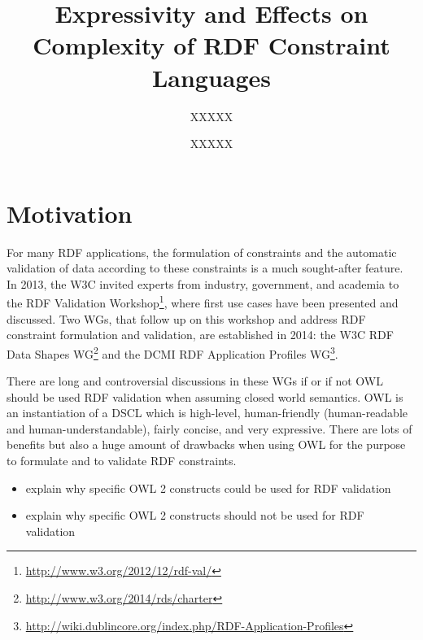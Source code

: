 \documentclass{llncs}
\begin{document}
%
%
\title{Expressivity and Effects on Complexity of RDF Constraint Languages}
%
%
\author{XXXXX \and XXXXX}
%
%

\maketitle              %

\begin{abstract}


\end{abstract}
%

\section{Motivation}

For many RDF applications, the formulation of constraints and the automatic validation of data according to these constraints is a much sought-after feature. 
In 2013, the W3C invited experts from industry, government, and academia to the RDF Validation Workshop\footnote{\url{http://www.w3.org/2012/12/rdf-val/}}, 
where first use cases have been presented and discussed. 
Two WGs, that follow up on this workshop and address RDF constraint formulation and validation, are established in 2014: 
the W3C RDF Data Shapes WG\footnote{\url{http://www.w3.org/2014/rds/charter}} and the DCMI RDF Application Profiles WG\footnote{\url{http://wiki.dublincore.org/index.php/RDF-Application-Profiles}}. 

There are long and controversial discussions in these WGs if or if not OWL should be used RDF validation when assuming closed world semantics.
OWL is an instantiation of a DSCL which is high-level, human-friendly (human-readable and human-understandable), fairly concise, and very expressive.
There are lots of benefits but also a huge amount of drawbacks when using OWL for the purpose to formulate and to validate RDF constraints.

\begin{itemize}
	\item explain why specific OWL 2 constructs could be used for RDF validation 
	\item explain why specific OWL 2 constructs should not be used for RDF validation
\end{itemize}
\end{document}
